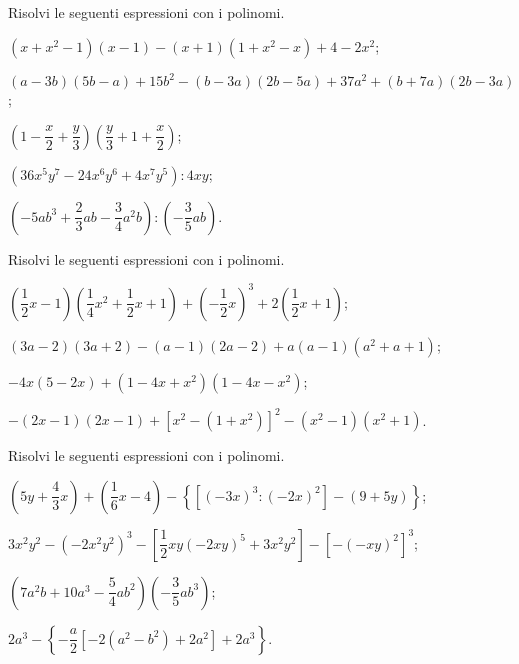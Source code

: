 \begin{esercizio}[\Ast]
\label{ese:11.45} %
Risolvi le seguenti espressioni con i polinomi.
 \begin{enumeratea}
 \item $\left(x+x^{2}-1\right)(x-1)-(x+1)\left(1+x^{2}-x\right)+4-2x^{2}$;
 \item $(a-3b)(5b-a)+15b^{2}-(b-3a)(2b-5a)+37a^{2}+(b+7a)(2b-3a)$;
 \item $\left(1-\dfrac{x}{2}+\dfrac{y}{3}\right)\left(\dfrac{y}{3}+1+\dfrac{x}{2}\right)$;
 \item $\left(36x^{5}y^{7}-24x^{6}y^{6}+4x^{7}y^{5}\right):4xy$;
 \item $\left(-5ab^{3}+\dfrac{2}{3}ab-\dfrac{3}{4}a^{2}b\right):\left(-\dfrac{3}{5}ab\right)$.
 \end{enumeratea}
\end{esercizio}

\begin{esercizio}[\Ast]
\label{ese:11.46} %
Risolvi le seguenti espressioni con i polinomi.
 \begin{enumeratea}
 \item $\left(\dfrac{1}{2}x-1\right)\left(\dfrac{1}{4}x^{2}+\dfrac{1}{2}x+1\right)+\left(-{\dfrac{1}{2}}x\right)^{3}+2\left(\dfrac{1}{2}x+1\right)$;
 \item $(3a-2)(3a+2)-(a-1)(2a-2)+a(a-1)\left(a^{2}+a+1\right)$;
 \item $-4x(5-2x)+\left(1-4x+x^{2}\right)\left(1-4x-x^{2}\right)$;
 \item $-(2x-1)(2x-1)+\left[x^{2}-\left(1+x^{2}\right)\right]^{2}-\left(x^{2}-1\right)\left(x^{2}+1\right)$.
 \end{enumeratea}
\end{esercizio}

\begin{esercizio}[\Ast]
\label{ese:11.47}
Risolvi le seguenti espressioni con i polinomi.
 \begin{enumeratea}
 \item $\left(5y+\dfrac{4}{3}x\right)+\left(\dfrac{1}{6}x-4\right)-\left\lbrace\left[(-3x)^3:(-2x)^2\right]-(9+5y)\right\rbrace$;
 \item $3x^{2}y^{2}-\left(-2x^{2}y^{2}\right)^{3}-\left[\dfrac{1}{2}xy(-2xy)^{5}+3x^{2}y^{2}\right]-\left[-(-xy)^{2}\right]^{3}$;
 \item $\left(7a^{2}b+10a^{3}-\dfrac{5}{4}ab^{2}\right)\left(-\dfrac{3}{5}ab^{3}\right)$;
 \item $2a^{3}-\left\lbrace-\dfrac{a}{2}\left[-2\left(a^{2}-b^{2}\right)+2a^{2}\right]+2a^{3}\right\rbrace$.
 \end{enumeratea}
\end{esercizio}

